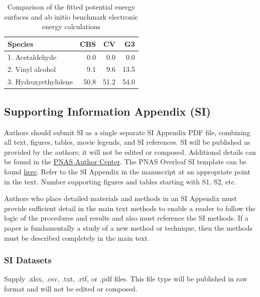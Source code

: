 \documentclass[9pt,twoside]{pnas-new}
\begin{document}
\begin{table}[t!]
\centering
\caption{Comparison of the fitted potential energy surfaces and ab initio benchmark electronic energy calculations}
\begin{tabular}{lrrr}
Species & CBS & CV & G3 \\
\midrule
1. Acetaldehyde & 0.0 & 0.0 & 0.0 \\
2. Vinyl alcohol & 9.1 & 9.6 & 13.5 \\
3. Hydroxyethylidene & 50.8 & 51.2 & 54.0\\
\bottomrule
\end{tabular}

\end{table}

\subsection*{Supporting Information Appendix (SI)}

Authors should submit SI as a single separate SI Appendix PDF file, combining all text, figures, tables, movie legends, and SI references. SI will be published as provided by the authors; it will not be edited or composed. Additional details can be found in the \href{https://www.pnas.org/authors/submitting-your-manuscript#manuscript-formatting-guidelines}{PNAS Author Center}. The PNAS Overleaf SI template can be found \href{https://www.overleaf.com/latex/templates/pnas-template-for-supplementary-information/wqfsfqwyjtsd}{here}. Refer to the SI Appendix in the manuscript at an appropriate point in the text. Number supporting figures and tables starting with S1, S2, etc.

Authors who place detailed materials and methods in an SI Appendix must provide sufficient detail in the main text methods to enable a reader to follow the logic of the procedures and results and also must reference the SI methods. If a paper is fundamentally a study of a new method or technique, then the methods must be described completely in the main text.

\subsubsection*{SI Datasets}

Supply .xlsx, .csv, .txt, .rtf, or .pdf files. This file type will be published in raw format and will not be edited or composed.
\end{document}
